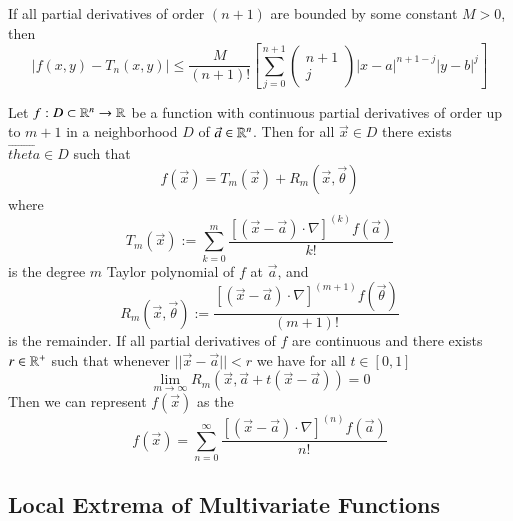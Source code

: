 \begin{appendices}
    \begin{rmk}
        If all partial derivatives of order $(n+1)$ are bounded by some constant $M > 0$, then \begin{equation}
            |f(x,y) - T_n(x,y)| \leq \frac{M}{(n+1)!}\left[\sum\limits_{j=0}^{n+1}\begin{pmatrix} n + 1 \\ j \end{pmatrix}|x-a|^{n+1-j}|y-b|^j\right]
        \end{equation}
    \end{rmk}
    
    
    \begin{namthm}
        Let $f:D\subset\mathbb R^n \rightarrow \mathbb R$ be a function with continuous partial derivatives of order up to $m+1$ in a neighborhood $D$ of $\vec{a} \in \mathbb R^n$. Then for all $\vec{x} \in D$ there exists $\vec{theta} \in D$ such that \begin{equation}
            f(\vec{x}) = T_m(\vec{x}) + R_m(\vec{x},\vec{\theta})
        \end{equation}
        where \begin{equation}
            T_m(\vec{x}) := \sum\limits_{k=0}^m\frac{\left[(\vec{x} - \vec{a})\cdot \nabla\right]^{(k)}f(\vec{a})}{k!}
        \end{equation}
        is the degree $m$ Taylor polynomial of $f$ at $\vec{a}$, and \begin{equation}
            R_m(\vec{x}, \vec{\theta}) := \frac{\left[(\vec{x} - \vec{a})\cdot \nabla\right]^{(m+1)}f(\vec{\theta})}{(m+1)!}
        \end{equation}
        is the remainder. If all partial derivatives of $f$ are continuous and there exists $r \in \mathbb R^{+}$ such that whenever $||\vec{x} - \vec{a}|| < r$ we have for all $t \in [0,1]$ \begin{equation}
            \lim_{m\rightarrow \infty} R_m(\vec{x}, \vec{a}+t(\vec{x} - \vec{a})) = 0
        \end{equation}
        Then we can represent $f(\vec{x})$ as the  \begin{equation}
            f(\vec{x}) = \sum\limits_{n = 0}^{\infty}\frac{\left[(\vec{x} - \vec{a})\cdot \nabla\right]^{(n)}f(\vec{a})}{n!}
        \end{equation}
    \end{namthm}
    
    \subsection{Local Extrema of Multivariate Functions}
    

\end{appendices}
